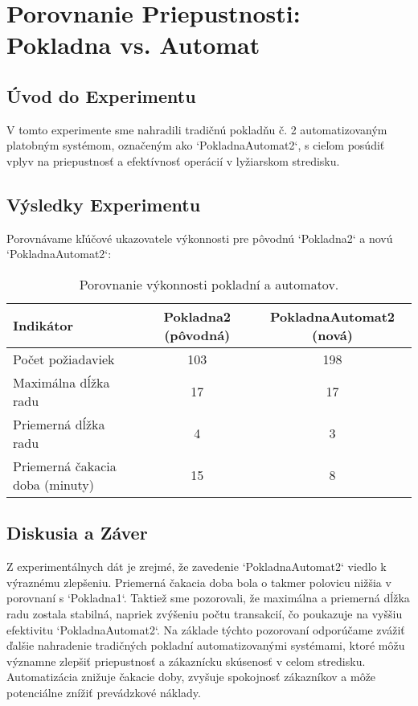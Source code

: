 ﻿\section{Porovnanie Priepustnosti: Pokladna vs. Automat}
\subsection{Úvod do Experimentu}
V tomto experimente sme nahradili tradičnú pokladňu č. 2 automatizovaným platobným systémom, označeným ako `PokladnaAutomat2`, s cieľom posúdiť vplyv na priepustnosť a efektívnosť operácií v lyžiarskom stredisku.

\subsection{Výsledky Experimentu}
Porovnávame kľúčové ukazovatele výkonnosti pre  pôvodnú `Pokladna2` a novú `PokladnaAutomat2`:

\begin{table}[h!]
\centering
\begin{tabular}{@{}lcc@{}}
\toprule
Indikátor &  Pokladna2 (pôvodná)  & PokladnaAutomat2 (nová) \\ \midrule
Počet požiadaviek & 103 &  198 \\
Maximálna dĺžka radu & 17 &  17 \\
Priemerná dĺžka radu & 4 &  3 \\
Priemerná čakacia doba (minuty) & 15 & 8 \\
\bottomrule
\end{tabular}
\caption{Porovnanie výkonnosti pokladní a automatov.}
\label{tab:performance_comparison}
\end{table}

\subsection{Diskusia a Záver}
Z experimentálnych dát je zrejmé, že zavedenie `PokladnaAutomat2` viedlo k výraznému zlepšeniu. 
Priemerná čakacia doba bola o takmer polovicu nižšia v porovnaní s `Pokladna1`. 
Taktiež sme pozorovali, že maximálna a priemerná dĺžka radu zostala stabilná, napriek zvýšeniu počtu transakcií,
čo poukazuje na vyššiu efektivitu `PokladnaAutomat2`.
Na základe týchto pozorovaní odporúčame zvážiť ďalšie nahradenie tradičných
pokladní automatizovanými systémami, ktoré môžu významne zlepšiť priepustnosť a zákaznícku skúsenosť v celom stredisku. 
Automatizácia znižuje čakacie doby, zvyšuje spokojnosť zákazníkov a môže potenciálne znížiť prevádzkové náklady.

